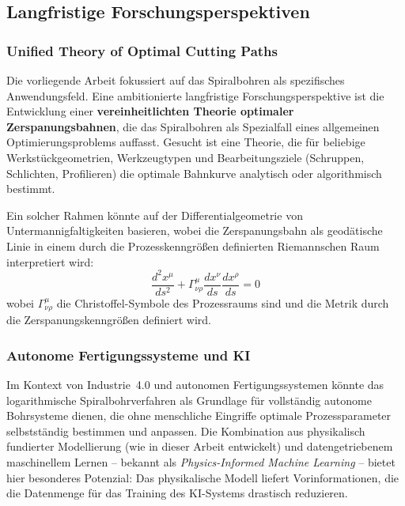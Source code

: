 ﻿\documentclass[12pt,a4paper]{article}
\begin{document}
\subsection{Langfristige Forschungsperspektiven}

\subsubsection{Unified Theory of Optimal Cutting Paths}

Die vorliegende Arbeit fokussiert auf das Spiralbohren als spezifisches Anwendungsfeld. Eine ambitionierte langfristige Forschungsperspektive ist die Entwicklung einer \textbf{vereinheitlichten Theorie optimaler Zerspanungsbahnen}, die das Spiralbohren als Spezialfall eines allgemeinen Optimierungsproblems auffasst. Gesucht ist eine Theorie, die für beliebige Werkstückgeometrien, Werkzeugtypen und Bearbeitungsziele (Schruppen, Schlichten, Profilieren) die optimale Bahnkurve analytisch oder algorithmisch bestimmt.

Ein solcher Rahmen könnte auf der Differentialgeometrie von Untermannigfaltigkeiten basieren, wobei die Zerspanungsbahn als geodätische Linie in einem durch die Prozesskenngrößen definierten Riemannschen Raum interpretiert wird:
\begin{equation}
    \frac{d^2 x^\mu}{ds^2} + \Gamma^\mu_{\nu\rho} \frac{dx^\nu}{ds} \frac{dx^\rho}{ds} = 0
\end{equation}
wobei $\Gamma^\mu_{\nu\rho}$ die Christoffel-Symbole des Prozessraums sind und die Metrik durch die Zerspanungskenngrößen definiert wird.

\subsubsection{Autonome Fertigungssysteme und KI}

Im Kontext von Industrie~4.0 und autonomen Fertigungssystemen könnte das logarithmische Spiralbohrverfahren als Grundlage für vollständig autonome Bohrsysteme dienen, die ohne menschliche Eingriffe optimale Prozessparameter selbstständig bestimmen und anpassen. Die Kombination aus physikalisch fundierter Modellierung (wie in dieser Arbeit entwickelt) und datengetriebenem maschinellem Lernen -- bekannt als \textit{Physics-Informed Machine Learning} -- bietet hier besonderes Potenzial: Das physikalische Modell liefert Vorinformationen, die die Datenmenge für das Training des KI-Systems drastisch reduzieren.
\end{document}
